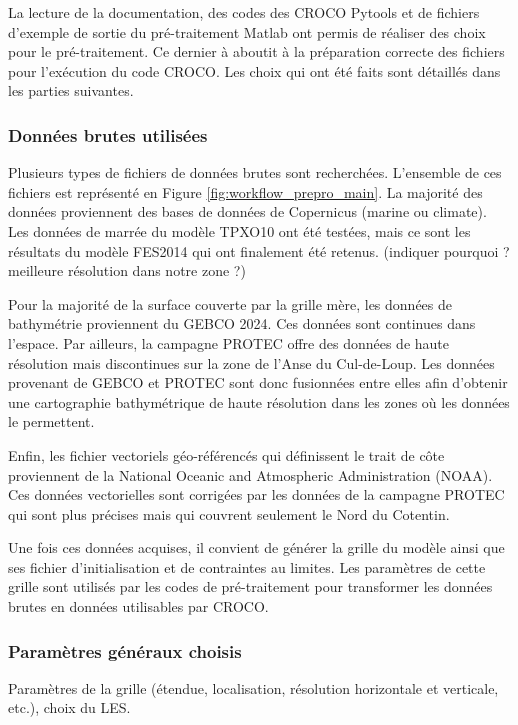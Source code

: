 \documentclass[10pt,a4paper,titlepage]{article}
\begin{document}
La lecture de la documentation, des codes des CROCO Pytools et de fichiers d'exemple de sortie du pré-traitement Matlab ont permis de réaliser des choix pour le pré-traitement.
Ce dernier à aboutit à la préparation correcte des fichiers pour l'exécution du code CROCO.
Les choix qui ont été faits sont détaillés dans les parties suivantes.

\subsubsection{Données brutes utilisées}
Plusieurs types de fichiers de données brutes sont recherchées. L'ensemble de ces fichiers est représenté en Figure \ref{fig:workflow_prepro_main}.
La majorité des données proviennent des bases de données de Copernicus (marine ou climate).
Les données de marrée du modèle TPXO10 ont été testées, mais ce sont les résultats du modèle FES2014 qui ont finalement été retenus. (indiquer pourquoi ? meilleure résolution dans notre zone ?)

Pour la majorité de la surface couverte par la grille mère, les données de bathymétrie proviennent du GEBCO 2024.
Ces données sont continues dans l'espace.
Par ailleurs, la campagne PROTEC offre des données de haute résolution mais discontinues sur la zone de l'Anse du Cul-de-Loup.
Les données provenant de GEBCO et PROTEC sont donc fusionnées entre elles afin d'obtenir une cartographie bathymétrique de haute résolution dans les zones où les données le permettent.

Enfin, les fichier vectoriels géo-référencés qui définissent le trait de côte proviennent de la National Oceanic and Atmospheric Administration (NOAA).
Ces données vectorielles sont corrigées par les données de la campagne PROTEC qui sont plus précises mais qui couvrent seulement le Nord du Cotentin.

Une fois ces données acquises, il convient de générer la grille du modèle ainsi que ses fichier d'initialisation et de contraintes au limites.
Les paramètres de cette grille sont utilisés par les codes de pré-traitement pour transformer les données brutes en données utilisables par CROCO.

\subsubsection{Paramètres généraux choisis}
{\color{lightgrey}
    Paramètres de la grille (étendue, localisation, résolution horizontale et verticale, etc.), choix du LES.
}
\end{document}
